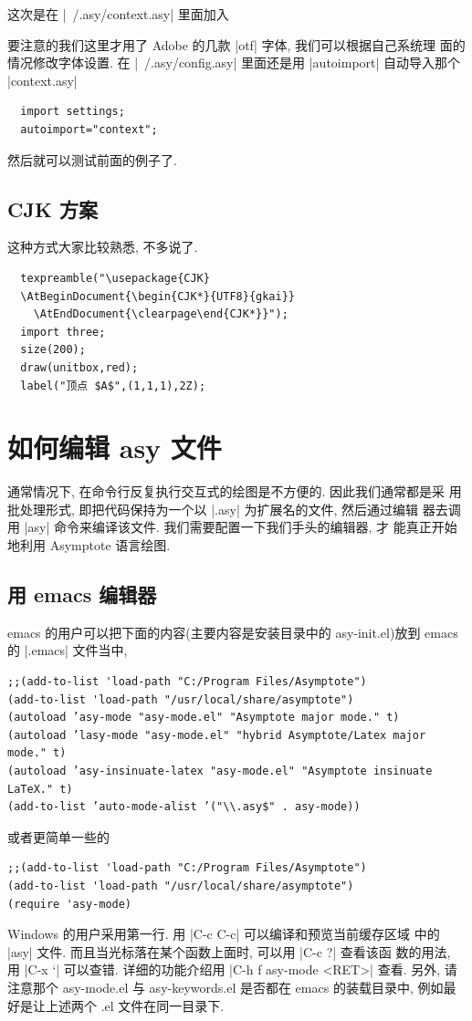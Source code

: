 \documentclass[nofonts,CJKnormalspaces]{ctexbook}[2009/05/20]
\begin{document}
这次是在 |~/.asy/context.asy| 里面加入

要注意的我们这里才用了 Adobe 的几款 |otf| 字体, 我们可以根据自己系统理
面的情况修改字体设置.
在 |~/.asy/config.asy| 里面还是用 |autoimport| 自动导入那个
|context.asy|
\begin{lstlisting}
  import settings;
  autoimport="context";
\end{lstlisting}
然后就可以测试前面的例子了.

\subsection{CJK 方案}
这种方式大家比较熟悉, 不多说了.
\begin{lstlisting}
  texpreamble("\usepackage{CJK}
  \AtBeginDocument{\begin{CJK*}{UTF8}{gkai}}
    \AtEndDocument{\clearpage\end{CJK*}}");
  import three;
  size(200);
  draw(unitbox,red);
  label("顶点 $A$",(1,1,1),2Z);
\end{lstlisting}

\section{如何编辑 asy 文件}
通常情况下, 在命令行反复执行交互式的绘图是不方便的. 因此我们通常都是采
用批处理形式, 即把代码保持为一个以 |.asy| 为扩展名的文件, 然后通过编辑
器去调用 |asy| 命令来编译该文件. 我们需要配置一下我们手头的编辑器, 才
能真正开始地利用 Asymptote 语言绘图.\label{asy:Editors}

\subsection{用 emacs 编辑器}
emacs 的用户可以把下面的内容(主要内容是安装目录中的 asy-init.el)放到 emacs
的 |.emacs| 文件当中,
\begin{verbatim}
;;(add-to-list 'load-path "C:/Program Files/Asymptote")
(add-to-list 'load-path "/usr/local/share/asymptote")
(autoload ’asy-mode "asy-mode.el" "Asymptote major mode." t)
(autoload ’lasy-mode "asy-mode.el" "hybrid Asymptote/Latex major mode." t)
(autoload ’asy-insinuate-latex "asy-mode.el" "Asymptote insinuate LaTeX." t)
(add-to-list ’auto-mode-alist ’("\\.asy$" . asy-mode))
\end{verbatim}
或者更简单一些的
\begin{verbatim}
;;(add-to-list 'load-path "C:/Program Files/Asymptote")
(add-to-list 'load-path "/usr/local/share/asymptote")
(require 'asy-mode)
\end{verbatim}
Windows 的用户采用第一行. 用 |C-c C-c| 可以编译和预览当前缓存区域
中的 |asy| 文件. 而且当光标落在某个函数上面时, 可以用 |C-c ?| 查看该函
数的用法, 用 |C-x `| 可以查错. 详细的功能介绍用 |C-h f asy-mode <RET>|
查看. 另外, 请注意那个 asy-mode.el 与 asy-keywords.el 是否都在 emacs
的装载目录中, 例如最好是让上述两个 .el 文件在同一目录下.
\end{document}
